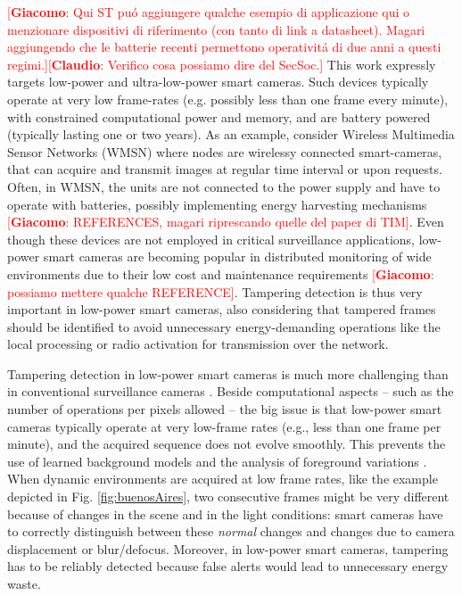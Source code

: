 \documentclass{llncs}
\newcommand{\gi}[1]{{\textcolor{red}{[\small \textbf{Giacomo}: #1]}}}
\newcommand{\cl}[1]{{\textcolor{red}{[\small \textbf{Claudio}: #1]}}}
\begin{document}
\gi{Qui ST pu\'o aggiungere qualche esempio di applicazione qui o menzionare dispositivi di riferimento (con tanto di link a datasheet). Magari aggiungendo che le batterie recenti permettono operativit\'a di due anni a questi regimi.}\cl{Verifico cosa possiamo dire del SecSoc.}
This work expressly targets low-power and ultra-low-power smart cameras. Such devices typically operate at very low frame-rates (e.g. possibly less than one frame every minute), with constrained computational power and memory, and are battery powered (typically lasting one or two years). 
As an example, consider Wireless Multimedia Sensor Networks (WMSN) \cite{akyildiz2007survey} where nodes are wirelessy connected smart-cameras, that can acquire and transmit images at regular time interval or upon requests. Often, in WMSN, the units are not connected to the power supply and have to operate with batteries, possibly implementing energy harvesting mechanisms \gi{REFERENCES, magari riprescando quelle del paper di TIM}. Even though these devices are not employed in critical surveillance applications, low-power smart cameras are becoming popular in distributed monitoring of wide environments due to their low cost and maintenance requirements \gi{possiamo mettere qualche REFERENCE}. Tampering detection is thus very important in low-power smart cameras, also considering that tampered frames should be identified to avoid unnecessary energy-demanding operations like the local processing or radio activation for transmission over the network.


Tampering detection in low-power smart cameras is much more challenging than in conventional surveillance cameras \cite{perrig2004security}. Beside computational aspects -- such as the number of operations per pixels allowed -- the big issue is that low-power smart cameras typically operate at very low-frame rates (e.g., less than one frame per minute), and the acquired sequence does not evolve smoothly. This prevents the use of learned background models and the analysis of foreground variations \cite{piccardi2004background}. When dynamic environments are acquired at low frame rates, like the example depicted in Fig. \ref{fig:buenosAires}, two consecutive frames might be very different because of changes in the scene and in the light conditions: smart cameras have to correctly distinguish between these \emph{normal} changes and changes due to camera displacement or blur/defocus. Moreover, in low-power smart cameras, tampering has to be reliably detected because false alerts would lead to unnecessary energy waste.
\end{document}
